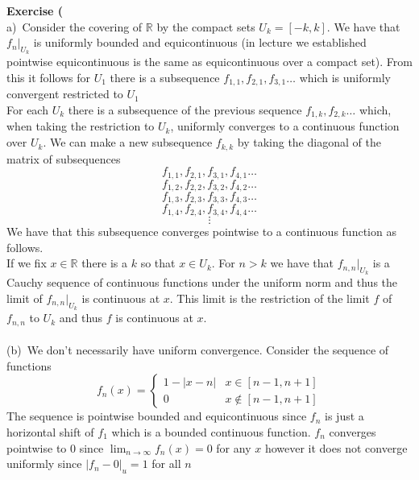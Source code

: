 \documentclass[12pt]{article}
\newenvironment{ques}[1]{\textbf{Exercise #1}\vspace{1 mm}\\ }{\bigskip}
\theoremstyle{definition}
\newcommand{\R}{\mathbb R}
\begin{document}
\begin{ques}{13}
	(a)\ Consider the covering of $\R$ by the compact sets $U_k = [-k,k]$. We
	have that $f_n|_{U_k}$ is uniformly bounded and equicontinuous (in lecture
	we established pointwise equicontinuous is the same as equicontinuous over
	a compact set). From this it follows for $U_1$ there is a subsequence
	$f_{1,1}, f_{2,1}, f_{3,1} \dots $ which is uniformly convergent restricted
	to $U_1$
	\\
	For each $U_k$ there is a subsequence of the previous sequence $f_{1,k},
	f_{2,k} \dots$ which, when taking the restriction to $U_k$, uniformly
	converges to a continuous function over $U_k$. We can make a new
	subsequence $f_{k,k}$ by taking the diagonal of the matrix of subsequences
	$$f_{1,1}, f_{2,1}, f_{3,1}, f_{4,1} \dots $$
	$$f_{1,2}, f_{2,2}, f_{3,2}, f_{4,2} \dots $$
	$$f_{1,3}, f_{2,3}, f_{3,3}, f_{4,3} \dots $$
	$$f_{1,4}, f_{2,4}, f_{3,4}, f_{4,4} \dots $$
	$$\vdots$$
	We have that this subsequence converges pointwise to a continuous function
	as follows.\\
	If we fix $x \in \R$ there is a $k$ so that $x \in U_k$. For $n > k$ we
	have that $f_{n,n}|_{U_k}$ is a Cauchy sequence of continuous functions
	under the uniform norm and thus the limit of $f_{n,n}|_{U_k}$ is
	continuous at $x$. This limit is the restriction of the limit $f$ of
	$f_{n,n}$ to $U_k$ and thus $f$ is continuous at $x$.\\
	\\
	(b)\ We don't necessarily have uniform convergence. Consider the sequence
	of functions
	$$f_n(x) = 
	\begin{cases}
		1 - |x - n| & x \in [n-1, n+1]\\
		0 & x \notin [n-1, n+1]
	\end{cases}
	$$
	The sequence is pointwise bounded and equicontinuous since $f_n$ is just a
	horizontal shift of $f_1$ which is a bounded continuous function. $f_n$ converges
	pointwise to $0$ since $\lim_{n \to \infty} f_n(x) = 0$ for any $x$ however
	it does not converge uniformly since $|f_n - 0|_u = 1$ for all $n$
\end{ques}
\end{document}
